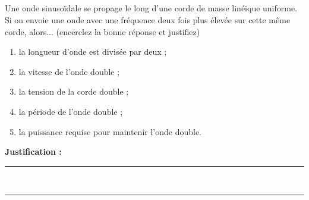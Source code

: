 \subsection{}
Une onde sinusoïdale se propage le long d'une corde de masse linéique uniforme. Si on envoie une onde avec une fréquence deux fois plus élevée sur cette même corde, alors... (encerclez la bonne réponse et justifiez)

\begin{enumerate}[label=\Alph*)]
    \item la longueur d'onde est divisée par deux ;
    \item la vitesse de l'onde double ;
    \item la tension de la corde double ;
    \item la période de l'onde double ;
    \item la puissance requise pour maintenir l'onde double.
\end{enumerate}

\noindent\textbf{Justification :} \hrulefill \\[2.5ex]
\rule{\linewidth}{0.4pt} \\[2.5ex]
\rule{\linewidth}{0.4pt}
\vfill